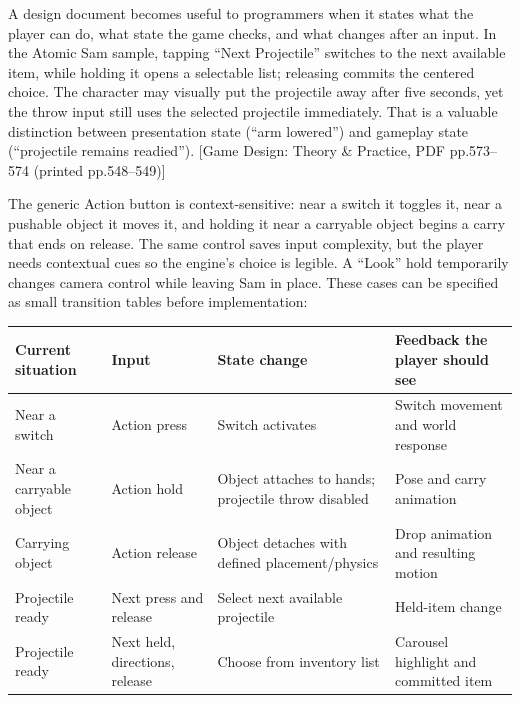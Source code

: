 A design document becomes useful to programmers when it states what the player can do, what state the game checks, and what changes after an input. In the Atomic Sam sample, tapping ``Next Projectile'' switches to the next available item, while holding it opens a selectable list; releasing commits the centered choice. The character may visually put the projectile away after five seconds, yet the throw input still uses the selected projectile immediately. That is a valuable distinction between presentation state (``arm lowered'') and gameplay state (``projectile remains readied''). {[}Game Design: Theory \& Practice, PDF pp.573--574 (printed pp.548--549){]}

The generic Action button is context-sensitive: near a switch it toggles it, near a pushable object it moves it, and holding it near a carryable object begins a carry that ends on release. The same control saves input complexity, but the player needs contextual cues so the engine's choice is legible. A ``Look'' hold temporarily changes camera control while leaving Sam in place. These cases can be specified as small transition tables before implementation:

{\def\LTcaptype{none} %
\begin{longtable}[]{@{}
  >{\raggedright\arraybackslash}p{}
  >{\raggedright\arraybackslash}p{}
  >{\raggedright\arraybackslash}p{}
  >{\raggedright\arraybackslash}p{}@{}}
\toprule\noalign{}
\begin{minipage}[b]{\linewidth}\raggedright
Current situation
\end{minipage} & \begin{minipage}[b]{\linewidth}\raggedright
Input
\end{minipage} & \begin{minipage}[b]{\linewidth}\raggedright
State change
\end{minipage} & \begin{minipage}[b]{\linewidth}\raggedright
Feedback the player should see
\end{minipage} \\
\midrule\noalign{}
\endhead
\bottomrule\noalign{}
\endlastfoot
Near a switch & Action press & Switch activates & Switch movement and world response \\
Near a carryable object & Action hold & Object attaches to hands; projectile throw disabled & Pose and carry animation \\
Carrying object & Action release & Object detaches with defined placement/physics & Drop animation and resulting motion \\
Projectile ready & Next press and release & Select next available projectile & Held-item change \\
Projectile ready & Next held, directions, release & Choose from inventory list & Carousel highlight and committed item \\
\end{longtable}
}

